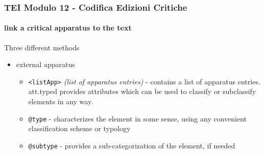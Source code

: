 \begin{frame}
    \frametitle{TEI Modulo 12 - Codifica Edizioni Critiche}
    \framesubtitle{link a critical apparatus to the text}
    \addtocounter{nframe}{1}
  
    \begin{block}{Three different methods}
       \begin{itemize}
           \item external apparatus
           \begin{itemize}
             \item \texttt{<listApp>} \textit{(list of apparatus entries)} - contains a list of apparatus entries. att.typed provides attributes which can be used to classify or subclassify elements in any way.
             \item \texttt{@type} - characterizes the element in some sense, using any convenient classification scheme or typology
             \item \texttt{@subtype} - provides a sub-categorization of the element, if needed
           \end{itemize}
       \end{itemize}
     \end{block}

\end{frame}


